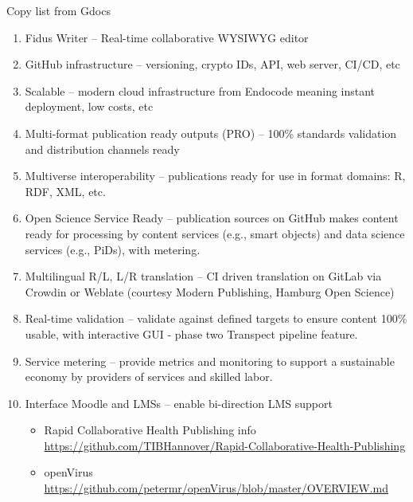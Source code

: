 \documentclass{article}
\begin{document}
Copy list from Gdocs

\begin{enumerate}
\item Fidus Writer – Real-time collaborative WYSIWYG editor


\item GitHub infrastructure – versioning, crypto IDs, API, web server, CI/CD, etc


\item Scalable – modern cloud infrastructure from Endocode meaning instant deployment, low costs, etc


\item Multi-format publication ready outputs (PRO) – 100\% standards validation and distribution channels ready


\item Multiverse interoperability – publications ready for use in format domains: R, RDF, XML, etc.


\item Open Science Service Ready – publication sources on GitHub makes content ready for processing by content services (e.g., smart objects) and data science services (e.g., PiDs), with metering.


\item Multilingual R/L, L/R translation – CI driven translation on GitLab via Crowdin or Weblate (courtesy Modern Publishing, Hamburg Open Science)


\item Real-time validation – validate against defined targets to ensure content 100\% usable, with interactive GUI - phase two Transpect pipeline feature.


\item Service metering – provide metrics and monitoring to support a sustainable economy by providers of services and skilled labor.


\item Interface Moodle and LMSs – enable bi-direction LMS support

\begin{itemize}
\item Rapid Collaborative Health Publishing info \href{https://github.com/TIBHannover/Rapid-Collaborative-Health-Publishing}{https://github.com/TIBHannover/Rapid-Collaborative-Health-Publishing}


\item openVirus \href{https://github.com/petermr/openVirus/blob/master/OVERVIEW.md}{https://github.com/petermr/openVirus/blob/master/OVERVIEW.md}



\end{itemize}
\end{enumerate}
\end{document}
